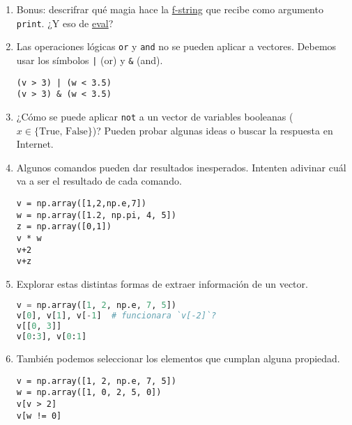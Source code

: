 \documentclass[a4paper,11pt]{article}
\theoremstyle{definition}
\begin{document}
\begin{enumerate}
Ejecutar los siguientes comandos e interpretar los resultados.

\begin{lstlisting}
np.set_printoptions(precision=2, suppress=True)
v = np.array([1,2,np.e,7])
w = np.array([1.2, np.pi, 4, 5])
for expr in [
    'v', 'w', 'v + w', 'v ** 2', 'v % 2', 'np.sum(v)', 'np.sqrt(w)', 'v > 3', 'w < 3.5'
]:
    print(f"{expr:11s} == {eval(expr)}")
\end{lstlisting}

\item Bonus: descrifrar qué magia hace la
\href{https://docs.python.org/es/3.11/tutorial/inputoutput.html\#tut-f-strings}{f-string} que recibe como argumento \lstinline{print}. ¿Y eso de \href{https://docs.python.org/es/3.11/library/functions.html\#eval}{eval}?

\item Las operaciones lógicas \lstinline{or} y \lstinline{and} no se pueden aplicar a vectores. Debemos usar los símbolos \lstinline{|} (or) y \lstinline{&} (and).
\begin{lstlisting}
(v > 3) | (w < 3.5)
(v > 3) & (w < 3.5)
\end{lstlisting}

\item ¿Cómo se puede aplicar \lstinline{not} a un vector de variables booleanas ($x \in \{\text{True, False}\}$)? Pueden probar algunas ideas o buscar la respuesta en Internet.

\item Algunos comandos pueden dar resultados inesperados. Intenten adivinar cuál va a ser el resultado de cada comando.
\begin{lstlisting}
v = np.array([1,2,np.e,7])
w = np.array([1.2, np.pi, 4, 5])
z = np.array([0,1])
v * w
v+2
v+z
\end{lstlisting}

\item Explorar estas distintas formas de extraer información de un vector.
\begin{lstlisting}[language=Python]
v = np.array([1, 2, np.e, 7, 5])
v[0], v[1], v[-1]  # funcionara `v[-2]`?
v[[0, 3]]
v[0:3], v[0:1]
\end{lstlisting}

\item También podemos seleccionar los elementos que cumplan alguna propiedad.
\begin{lstlisting}
v = np.array([1, 2, np.e, 7, 5])
w = np.array([1, 0, 2, 5, 0])
v[v > 2]
v[w != 0]
\end{lstlisting}


\end{enumerate}
\end{document}
